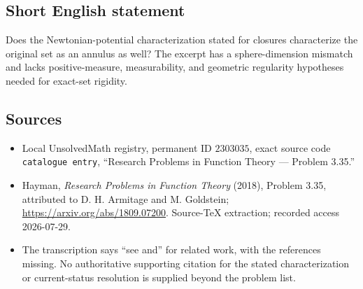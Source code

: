 \documentclass[11pt]{article}
\begin{document}
\subsection{Short English statement}
Does the Newtonian-potential characterization stated for closures characterize the original set as an annulus as well? The excerpt has a sphere-dimension mismatch and lacks positive-measure, measurability, and geometric regularity hypotheses needed for exact-set rigidity.
\subsection{Sources}
\begin{itemize}
\item Local UnsolvedMath registry, permanent ID \(2303035\), exact source code \texttt{catalogue entry}, ``Research Problems in Function Theory --- Problem 3.35.''
\item Hayman, \emph{Research Problems in Function Theory} (2018), Problem 3.35, attributed to D. H. Armitage and M. Goldstein; \url{https://arxiv.org/abs/1809.07200}. Source-TeX extraction; recorded access 2026-07-29.
\item The transcription says ``see and'' for related work, with the references missing. No authoritative supporting citation for the stated characterization or current-status resolution is supplied beyond the problem list.
\end{itemize}
\end{document}
